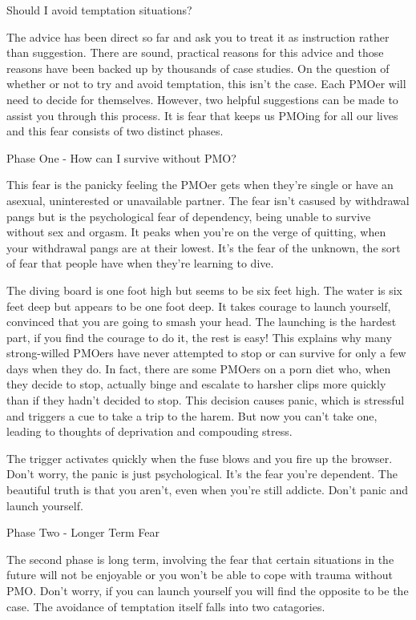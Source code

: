 Should I avoid temptation situations?

The advice has been direct so far and ask you to treat it as instruction rather than suggestion. There are sound, practical reasons for this advice and those reasons have been backed up by thousands of case studies. On the question of whether or not to try and avoid temptation, this isn't the case. Each PMOer will need to decide for themselves. However, two helpful suggestions can be made to assist you through this process. It is fear that keeps us PMOing for all our lives and this fear consists of two distinct phases.

Phase One - How can I survive without PMO?

This fear is the panicky feeling the PMOer gets when they're single or have an asexual, uninterested or unavailable partner. The fear isn't casused by withdrawal pangs but is the psychological fear of dependency, being unable to survive without sex and orgasm. It peaks when you're on the verge of quitting, when your withdrawal pangs are at their lowest. It's the fear of the unknown, the sort of fear that people have when they're learning to dive.

The diving board is one foot high but seems to be six feet high. The water is six feet deep but appears to be one foot deep. It takes courage to launch yourself, convinced that you are going to smash your head. The launching is the hardest part, if you find the courage to do it, the rest is easy! This explains why many strong-willed PMOers have never attempted to stop or can survive for only a few days when they do. In fact, there are some PMOers on a porn diet who, when they decide to stop, actually binge and escalate to harsher clips more quickly than if they hadn't decided to stop. This decision causes panic, which is stressful and triggers a cue to take a trip to the harem. But now you can't take one, leading to thoughts of deprivation and compouding stress.

The trigger activates quickly when the fuse blows and you fire up the browser. Don't worry, the panic is just psychological. It's the fear you're dependent. The beautiful truth is that you aren't, even when you're still addicte. Don't panic and launch yourself.

Phase Two - Longer Term Fear

The second phase is long term, involving the fear that certain situations in the future will not be enjoyable or you won't be able to cope with trauma without PMO. Don't worry, if you can launch yourself you will find the opposite to be the case. The avoidance of temptation itself falls into two catagories.

